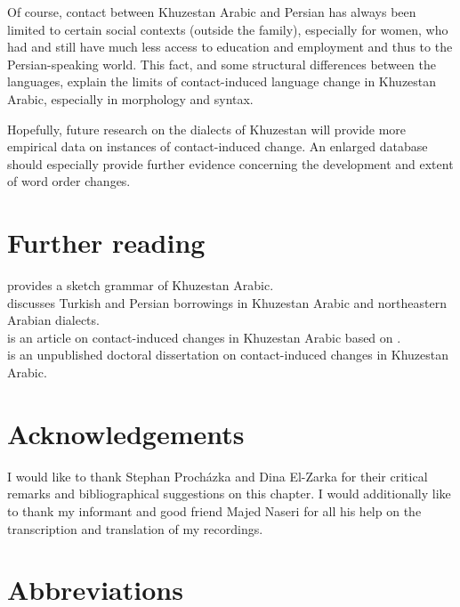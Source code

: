 \documentclass[output=paper,nonflat]{langsci/langscibook}
\begin{document}
Of course, contact between Khuzestan Arabic and Persian has always been limited to certain social contexts (outside the family), especially for women, who had and still have much less access to education and employment and thus to the Persian-speaking world. This fact, and some structural differences between the languages, explain the limits of contact-induced language change in Khuzestan Arabic, especially in morphology and syntax.

Hopefully, future research on the dialects of Khuzestan will provide more empirical data on instances of contact-induced change. An enlarged database should especially provide further evidence concerning the development and extent of word order changes.

\section*{Further reading}


\citet{Ingham2011khuz} provides a sketch grammar of Khuzestan Arabic.\\
\citet{Ingham2005} discusses Turkish and Persian borrowings in Khuzestan Arabic and northeastern Arabian dialects.\\
\citet{MatrasShabibi2007} is an article on contact-induced changes in Khuzestan Arabic based on \citet{Shabibi2006}.\\
\citet{Shabibi2006} is an unpublished doctoral dissertation on contact-induced changes in Khuzestan Arabic.



\section*{Acknowledgements}

I would like to thank Stephan Procházka and Dina El-Zarka for their critical remarks and bibliographical suggestions on this chapter. I would additionally like to thank my informant and good friend Majed Naseri for all his help on the transcription and translation of my recordings.

\section*{Abbreviations}
\end{document}
